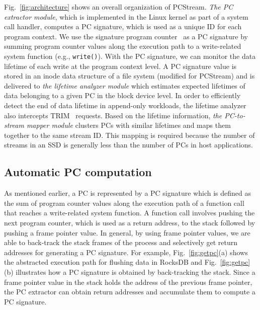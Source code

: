 Fig.~\ref{fig:architecture} shows an overall organization of \textsf{\small PCStream}.
\textit{The PC extractor module}, which is implemented in the Linux kernel as
part of a system call handler, 
computes a PC signature, which is used as a unique ID for each program context.  
We use the signature program counter~\cite{PC} as a PC signature 
by summing program counter values along the execution path to a write-related system function 
(e.g., {\tt write()}).  
With the PC signature, we can monitor the data lifetime of each write at the program context level. 
A PC signature value is stored
in an inode data structure of a file system (modified for \textsf{\small PCStream})
and is delivered to \textit{the lifetime analyzer module} which estimates
expected lifetimes of data belonging to a given PC in the block device level.
In order to efficiently detect the end of data lifetime in append-only
workloads, the lifetime analyzer also intercepts TRIM~\cite{TRIM} requests. %
Based on the lifetime information, \textit{the PC-to-stream
mapper module} clusters PCs with similar lifetimes and maps them together to
the same stream ID.  This mapping is required because 
the number of streams in an SSD is generally less than the number of PCs in host applications.

\subsection{Automatic PC computation}
As mentioned earlier, a PC is represented by a PC signature which is defined as
the sum of program counter values along the execution path of a function call that
reaches a write-related system function. A function call involves
pushing the next program counter, which is used as a return address, to the
stack followed by pushing a frame pointer value.  In general, by using frame
pointer values, we are able to back-track the stack frames of the process and
selectively get return addresses for generating a PC signature.  For example,
Fig.~\ref{fig:getpc}(a) shows the abstracted execution path for flushing data
in RocksDB and Fig.~\ref{fig:getpc}(b) illustrates how a PC signature is obtained
by back-tracking the stack.  
Since a frame pointer value in the stack holds the address of the previous
frame pointer, the PC extractor can obtain return addresses and
accumulate them to compute a PC signature. 


